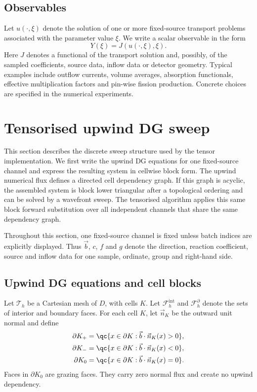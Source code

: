 \documentclass[final]{amsart}
\begin{document}
\subsection{Observables}

Let $u(\cdot,\xi)$ denote the solution of one or more fixed-source
transport problems associated with the parameter value $\xi$. We write a
scalar observable in the form
\begin{equation}
  Y(\xi)
  =
  J(u(\cdot,\xi),\xi).
  \label{eq:model_observable}
\end{equation}
Here $J$ denotes a functional of the transport solution and, possibly,
of the sampled coefficients, source data, inflow data or detector
geometry. Typical examples include outflow currents, volume averages,
absorption functionals, effective multiplication factors and pin-wise
fission production. Concrete choices are specified in the
numerical experiments.

\section{Tensorised upwind DG sweep}
\label{sec:analysis}

This section describes the discrete sweep structure used by the tensor
implementation. We first write the upwind DG equations for one
fixed-source channel and express the resulting system in cellwise block
form. The upwind numerical flux defines a directed cell dependency
graph. If this graph is acyclic, the assembled system is block lower
triangular after a topological ordering and can be solved by a
wavefront sweep. The tensorised algorithm applies this same block
forward substitution over all independent channels that share the same
dependency graph.

Throughout this section, one fixed-source channel is fixed unless batch
indices are explicitly displayed. Thus $\vec b$, $c$, $f$ and $g$
denote the direction, reaction coefficient, source and inflow data for
one sample, ordinate, group and right-hand side.

\subsection{Upwind DG equations and cell blocks}

Let $\mathcal{T}_h$ be a Cartesian mesh of $D$, with cells $K$. Let
$\mathcal{F}_h^{\mathrm{int}}$ and $\mathcal{F}_h^{\partial}$ denote
the sets of interior and boundary faces. For each cell $K$, let $\vec
n_K$ be the outward unit normal and define
\begin{align}
\partial K_+
&=
\qc{x\in\partial K:\vec b\cdot\vec n_K(x)>0},
\\
\partial K_-
&=
\qc{x\in\partial K:\vec b\cdot\vec n_K(x)<0},
\\
\partial K_0
&=
\qc{x\in\partial K:\vec b\cdot\vec n_K(x)=0}.
\end{align}
Faces in $\partial K_0$ are grazing faces. They carry zero normal flux
and create no upwind dependency.
\end{document}
